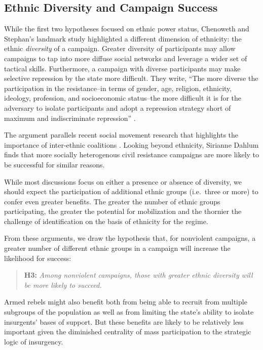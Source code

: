 \documentclass[
  letterpaper,
  DIV=11,
  numbers=noendperiod]{scrartcl}
\begin{document}
\subsection{\texorpdfstring{\textbf{Ethnic Diversity and Campaign
Success}}{Ethnic Diversity and Campaign Success}}\label{ethnic-diversity-and-campaign-success}

While the first two hypotheses focused on ethnic power status, Chenoweth
and Stephan's \autocite*{Chenoweth2011} landmark study highlighted a
different dimension of ethnicity: the ethnic \emph{diversity} of a
campaign. Greater diversity of participants may allow campaigns to tap
into more diffuse social networks and leverage a wider set of tactical
skills. Furthermore, a campaign with diverse participants may make
selective repression by the state more difficult. They write, ``The more
diverse the participation in the resistance--in terms of gender, age,
religion, ethnicity, ideology, profession, and socioeconomic status--the
more difficult it is for the adversary to isolate participants and adopt
a repression strategy short of maximum and indiscriminate repression''
\autocite[40]{Chenoweth2011}.

The argument parallels recent social movement research that highlights
the importance of inter-ethnic coalitions
\autocite{Dixon2013,Gawerc2020}. Looking beyond ethnicity, Sirianne
Dahlum \autocite*{Dahlum2023} finds that more socially heterogenous
civil resistance campaigns are more likely to be successful for similar
reasons.

While most discussions focus on either a presence or absence of
diversity, we should expect the participation of additional ethnic
groups (i.e.~three or more) to confer even greater benefits. The greater
the number of ethnic groups participating, the greater the potential for
mobilization and the thornier the challenge of identification on the
basis of ethnicity for the regime.

From these arguments, we draw the hypothesis that, for nonviolent
campaigns, a greater number of different ethnic groups in a campaign
will increase the likelihood for success:

\begin{quote}
\textbf{H3:} \emph{Among nonviolent campaigns, those with greater ethnic
diversity will be more likely to succeed.}
\end{quote}

Armed rebels might also benefit both from being able to recruit from
multiple subgroups of the population as well as from limiting the
state's ability to isolate insurgents' bases of support. But these
benefits are likely to be relatively less important given the diminished
centrality of mass participation to the strategic logic of insurgency.
\end{document}
